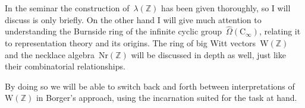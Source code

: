 In the seminar the construction of~$\lambda(\mathbb{Z})$ has been given thoroughly, so I will discuss is only briefly. On the other hand I will give much attention to understanding the Burnside ring of the infinite cyclic group~$\hat{\Omega}(\mathrm{C}_\infty)$, relating it to representation theory and its origins. The ring of big Witt vectors~$\mathrm{W}(\mathbb{Z})$ and the necklace algebra~$\mathrm{Nr}(\mathbb{Z})$ will be discussed in depth as well, just like their combinatorial relationships.

By doing so we will be able to switch back and forth between interpretations of~$\mathrm{W}(\mathbb{Z})$ in Borger's approach, using the incarnation suited for the task at hand.
